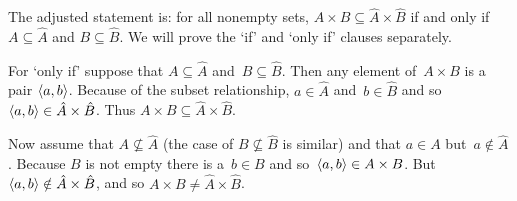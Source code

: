 \documentclass{ibl}  %
\begin{document}
\begin{problem}
\begin{exes}
\begin{answer}
  The adjusted statement is: for all nonempty sets,  
  $A\times B\subseteq \hat{A}\times \hat{B}$ if and only if
  $A\subseteq \hat{A}$ and $B\subseteq \hat{B}$.
  We will prove the `if' and `only if' clauses separately.

  For `only if' suppose that $A\subseteq \hat{A}$ and~$B\subseteq \hat{B}$.
  Then any element of~$A\times B$ is a pair $\langle a,b\rangle$. 
  Because of the subset relationship, $a\in \hat{A}$ and~$b\in \hat{B}$
  and so $\langle a,b\rangle\in \hat{A}\times \hat{B}$.
  Thus $A\times B\subseteq \hat{A}\times \hat{B}$.

  Now assume that $A\not\subseteq \hat{A}$ (the case 
  of $B\not\subseteq \hat{B}$ is similar) and that $a\in A$ 
  but~$a\notin \hat{A}$.
  Because $B$ is not empty there is a~$b\in B$ and 
  so~$\langle a,b\rangle\in A\times B$.
  But $\langle a,b\rangle\notin \hat{A}\times \hat{B}$,
  and so $A\times B\neq \hat{A}\times \hat{B}$.     
\end{answer}
\end{exes}
\end{problem}
\end{document}
